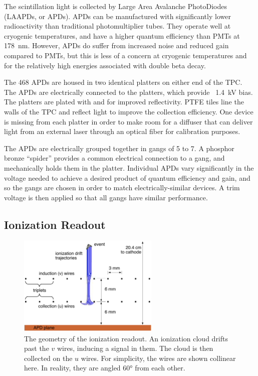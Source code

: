 \documentclass[herrin-thesis.tex]{subfiles}
\begin{document}
The scintillation light is collected by Large Area Avalanche PhotoDiodes (LAAPDs, or APDs). APDs can be manufactured with significantly lower radioactivity than traditional photomultiplier tubes. They operate well at cryogenic temperatures, and have a higher quantum efficiency than PMTs at \SI{178}{\nm}. However, APDs do suffer from increased noise and reduced gain compared to PMTs, but this is less of a concern at cryogenic temperatures and for the relatively high energies associated with double beta decay.

The 468 APDs are housed in two identical platters on either end of the TPC. The APDs are electrically connected to the platters, which provide \about~\SI{1.4}{\kV} bias. The platters are plated with  and  for improved reflectivity. PTFE tiles line the walls of the TPC and reflect light to improve the collection efficiency. One device is missing from each platter in order to make room for a diffuser that can deliver light from an external laser through an optical fiber for calibration purposes.

The APDs are electrically grouped together in gangs of 5 to 7. A phosphor bronze ``spider'' provides a common electrical connection to a gang, and mechanically holds them in the platter. Individual APDs vary significantly in the voltage needed to achieve a desired product of quantum efficiency and gain, and so the gangs are chosen in order to match electrically-similar devices\cite{Neilson:2009fk}. A trim voltage is then applied so that all gangs have similar performance.

\subsection{Ionization Readout}

\begin{figure}
\centering
\includegraphics[width=0.6\textwidth]{./figures/detector_wire_geometry.pdf}
\caption[Geometry of the ionization readout wire planes]{The geometry of the ionization readout. An ionization cloud drifts past the \(v\) wires, inducing a signal in them. The cloud is then collected on the \(u\) wires. For simplicity, the wires are shown collinear here. In reality, they are angled \ang{60} from each other.}
\label{fig:detector_wire_geometry}
\end{figure}
\end{document}
